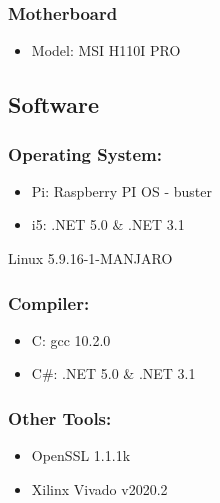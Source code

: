 \documentclass[a4paper, openany]{book}
\begin{document}
\begin{appendix}
\begin{minipage}{0.4\textwidth}
\subsubsection{Motherboard}
\begin{itemize}
\itemsep0em
\item Model: MSI H110I PRO\\
\end{itemize}
\end{minipage}
\hspace{2cm}
\begin{minipage}{0.4\textwidth}
\subsection{Software}
\subsubsection{Operating System:}
\begin{itemize}
\itemsep0em
\item Pi: Raspberry PI OS - buster\\
\item i5: .NET 5.0 & .NET 3.1\\
\end{itemize}
Linux 5.9.16-1-MANJARO
\subsubsection{Compiler:}
\begin{itemize}
\itemsep0em
\item C: gcc 10.2.0\\
\item C#: .NET 5.0 & .NET 3.1\\
\end{itemize}
\subsubsection{Other Tools:}
\begin{itemize}
\itemsep0em
\item OpenSSL 1.1.1k\\
\item Xilinx Vivado v2020.2\\
\end{itemize}
\end{minipage}

\end{appendix}
\end{document}
